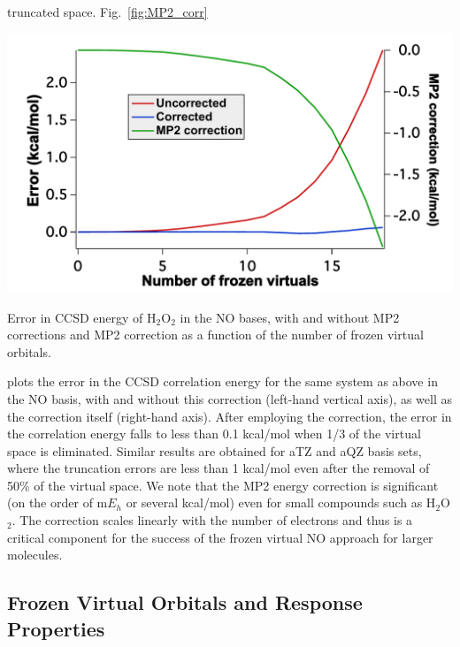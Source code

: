 truncated space.  Fig.~\ref{fig:MP2_corr} 
\begin{MyFigure}[h!]
\centering
\includegraphics[width=0.6\linewidth,natwidth=610,natheight=642]{figures_fvno/Mp2c.pdf}
\caption{{\footnotesize Error in CCSD energy of H$_2$O$_2$ in the NO bases, with and without MP2 corrections
        and MP2 correction as a function of the number of frozen virtual orbitals.}}
\label{fig:MP2_corr}
\end{MyFigure}
plots the error in the CCSD correlation energy for the same system as above in the NO basis, with and
without this correction (left-hand vertical axis), as well as the correction
itself (right-hand axis).  After employing the correction, the error in the
correlation energy falls to less than 0.1 kcal/mol when 1/3 of the virtual
space is eliminated. Similar results are obtained for aTZ and aQZ basis sets,
where the truncation errors are less than 1 kcal/mol even after the removal of 50\%
of the virtual space. We note that the MP2 energy correction is significant 
(on the order of m$E_h$ or several kcal/mol) even for small compounds such as 
H$_2$O$_2$.  The correction scales linearly with the number of electrons and 
thus is a critical component for the success of the frozen virtual NO approach 
for larger molecules.

\subsection{Frozen Virtual Orbitals and Response Properties}

